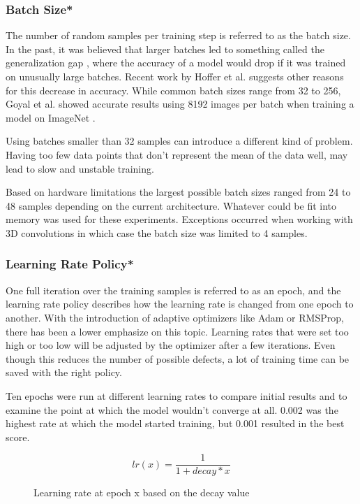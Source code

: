 \subsubsection{Batch Size*}

The number of random samples per training step is referred to as the batch size. In the past, it was believed that larger batches led to something called the generalization gap \cite{Keskar2016}, where the accuracy of a model would drop if it was trained on unusually large batches. Recent work by Hoffer et al. \cite{Hoffer2017} suggests other reasons for this decrease in accuracy. While common batch sizes range from 32 to 256, Goyal et al. showed accurate results using 8192 images per batch when training a model on ImageNet \cite{Goyal2017}.

Using batches smaller than 32 samples can introduce a different kind of problem. Having too few data points that don't represent the mean of the data well, may lead to slow and unstable training.

Based on hardware limitations the largest possible batch sizes ranged from 24 to 48 samples depending on the current architecture. Whatever could be fit into memory was used for these experiments. Exceptions occurred when working with 3D convolutions in which case the batch size was limited to 4 samples.

\subsubsection{Learning Rate Policy*}

One full iteration over the training samples is referred to as an epoch, and the learning rate policy describes how the learning rate is changed from one epoch to another. With the introduction of adaptive optimizers like Adam or RMSProp, there has been a lower emphasize on this topic. Learning rates that were set too high or too low will be adjusted by the optimizer after a few iterations. Even though this reduces the number of possible defects, a lot of training time can be saved with the right policy.

Ten epochs were run at different learning rates to compare initial results and to examine the point at which the model wouldn't converge at all. 0.002 was the highest rate at which the model started training, but 0.001 resulted in the best score.

\begin{figure}[H]
\[
lr(x) = \frac{1}{1 + decay * x}
\]
\caption{Learning rate at epoch x based on the decay value}
\end{figure}

